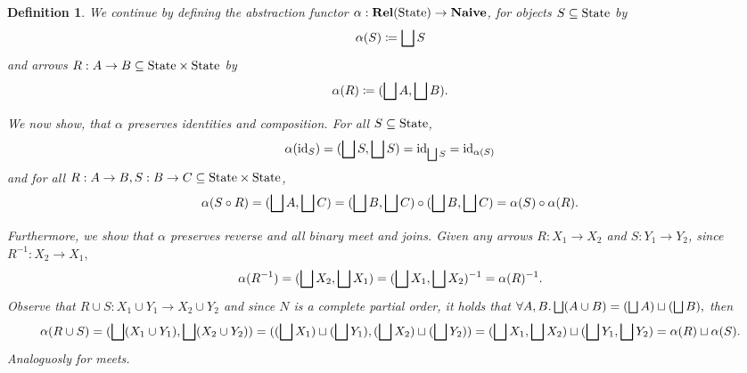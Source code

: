 \documentclass{article}
\newtheorem{definition}[theorem]{Definition}
\newcommand{\State}{\ensuremath \text{State}}
\newcommand{\id}{\ensuremath \operatorname{id}}
\newcommand{\Rel}{\ensuremath \mathbf{Rel}}
\newcommand{\Naive}{\ensuremath \mathbf{Naive}}
\newcommand{\lub}{\ensuremath \bigsqcup}
\begin{document}
\begin{definition}\normalfont
  We continue by defining the abstraction functor $\alpha : \Rel(\State) \rightarrow \Naive$, for objects $S \subseteq \State$ by
  \[
     \alpha(S) \coloneqq \lub S
  \]
  and arrows $R : A \rightarrow B \subseteq \State \times \State$ by
  \[
     \alpha(R) \coloneqq (\lub A, \lub B).
  \]

  We now show, that $\alpha$ preserves identities and composition. For all $S \subseteq \State$, \begin{dmath*}\alpha(\id_S) = (\lub S, \lub S) = \id_{\lub S} = \id_{\alpha(S)}\end{dmath*} and for all $R : A \rightarrow B, S : B \rightarrow C \subseteq \State \times \State$, \begin{dmath*} \alpha(S \circ R) = (\lub A, \lub C) = (\lub B, \lub C) \circ (\lub B, \lub C) = \alpha(S) \circ \alpha(R). \end{dmath*}

  Furthermore, we show that $\alpha$ preserves reverse and all binary meet and joins. Given any arrows $R: X_1 \rightarrow X_2$ and $S:Y_1 \rightarrow Y_2$, since $R^{-1} : X_2 \rightarrow X_1,$
  \begin{dmath*}
    \alpha(R^{-1}) = (\lub X_2, \lub X_1)
                   = (\lub X_1, \lub X_2)^{-1}
                   = \alpha(R)^{-1}.
  \end{dmath*}
  Observe that $R \cup S : X_1 \cup Y_1 \rightarrow X_2 \cup Y_2$ and since $N$ is a complete partial order, it holds that $\forall A,B. \lub(A \cup B) = (\lub A) \sqcup (\lub B),$ then
 \begin{dmath*} \alpha(R \cup S) = (\lub(X_1 \cup Y_1),\lub(X_2\cup Y_2))
                                 = ((\lub X_1) \sqcup (\lub Y_1), (\lub X_2) \sqcup (\lub Y_2))
                                 = (\lub X_1,\lub X_2) \sqcup (\lub Y_1, \lub Y_2)
                                 = \alpha(R) \sqcup \alpha(S).
 \end{dmath*}
 Analoguosly for meets.
\end{definition}
\end{document}
